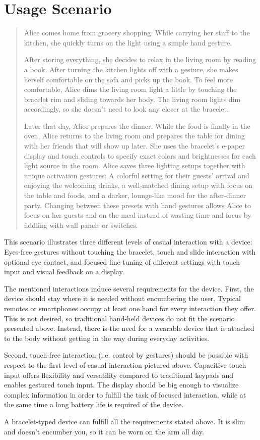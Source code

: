 \chapter{Usage Scenario}

\begin{quotation}
Alice comes home from grocery shopping. While carrying her stuff to the kitchen, she quickly turns on the light using a simple hand gesture.

After storing everything, she decides to relax in the living room by reading a book. After turning the kitchen lights off with a gesture, she makes herself comfortable on the sofa and picks up the book. To feel more comfortable, Alice dims the living room light a little by touching the bracelet rim and sliding towards her body. The living room lights dim accordingly, so she doesn't need to look any closer at the bracelet.

Later that day, Alice prepares the dinner. While the food is finally in the oven, Alice returns to the living room and prepares the table for dining with her friends that will show up later. She uses the bracelet's e-paper display and touch controls to specify exact colors and brightnesses for each light source in the room. Alice saves three lighting setups together with unique activation gestures: A colorful setting for their guests' arrival and enjoying the welcoming drinks, a well-matched dining setup with focus on the table and foods, and a darker, lounge-like mood for the after-dinner party. Changing between these presets with hand gestures allows Alice to focus on her guests and on the meal instead of wasting time and focus by fiddling with wall panels or switches.
\end{quotation}

This scenario illustrates three different levels of casual interaction with a device: Eyes-free gestures without touching the bracelet, touch and slide interaction with optional eye contact, and focused fine-tuning of different settings with touch input and visual feedback on a display.

The mentioned interactions induce several requirements for the device. First, the device should stay where it is needed without encumbering the user. Typical remotes or smartphones occupy at least one hand for every interaction they offer. This is not desired, so traditional hand-held devices do not fit the scenario presented above. Instead, there is the need for a wearable device that is attached to the body without getting in the way during everyday activities.

Second, touch-free interaction (i.e. control by gestures) should be possible with respect to the first level of casual interaction pictured above. Capacitive touch input offers flexibility and versatility compared to traditional keypads and enables gestured touch input. The display should be big enough to visualize complex information in order to fulfill the task of focused interaction, while at the same time a long battery life is required of the device.

A bracelet-typed device can fulfill all the requirements stated above. It is slim and doesn't encumber you, so it can be worn on the arm all day.